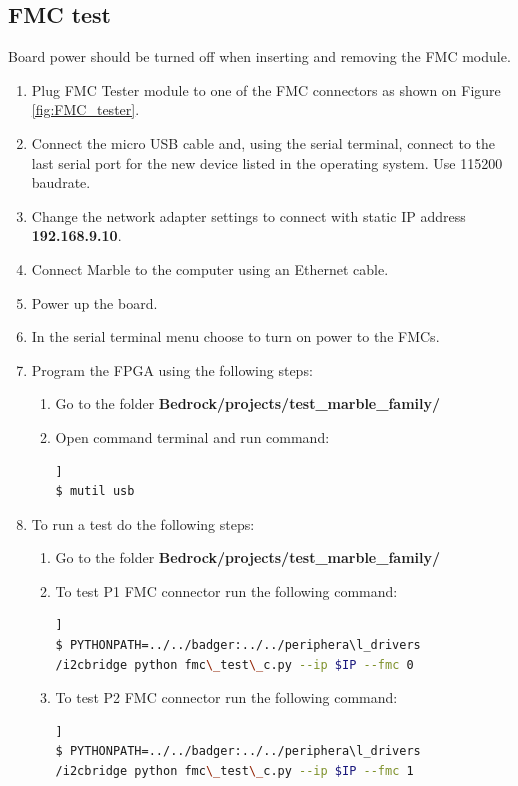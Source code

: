 \documentclass[12pt,oneside,a4]{article}
\begin{document}
\subsection{FMC test}
\begin{leftbar}
Board power should be turned off when inserting and removing the FMC module.
\end{leftbar}
\begin{enumerate}
	\item Plug FMC Tester module to one of the FMC connectors as shown on Figure \ref{fig:FMC_tester}.
	\item Connect the micro USB cable and, using the serial terminal, connect to the last serial port for the new device listed in the operating system. Use 115200 baudrate.
	\item Change the network adapter settings to connect with static IP address \textbf{192.168.9.10}.
	\item Connect Marble to the computer using an Ethernet cable.
	\item Power up the board.
	\item In the serial terminal menu choose  to turn on power to the FMCs.
	\item Program the FPGA using the following steps:
	\begin{enumerate}
	\item Go to the folder \textbf{Bedrock/projects/test\_marble\_family/}
	\item Open command terminal and run command:
	\begin{lstlisting}[backgroundcolor = \color{Gainsboro}, language=bash, frame=none]]
$ mutil usb
	\end{lstlisting}
	\end{enumerate}
	\item To run a test do the following steps:
	\begin{enumerate}
	\item Go to the folder \textbf{Bedrock/projects/test\_marble\_family/}
	\item To test P1 FMC connector run the following command:
	\begin{lstlisting}[backgroundcolor = \color{Gainsboro}, language=bash, frame=none]]
$ PYTHONPATH=../../badger:../../periphera\l_drivers
/i2cbridge python fmc\_test\_c.py --ip $IP --fmc 0
	\end{lstlisting}
	\item To test P2 FMC connector run the following command:
	\begin{lstlisting}[backgroundcolor = \color{Gainsboro}, language=bash, frame=none]]
$ PYTHONPATH=../../badger:../../periphera\l_drivers
/i2cbridge python fmc\_test\_c.py --ip $IP --fmc 1
	\end{lstlisting}
	\end{enumerate}
\end{enumerate}
\end{document}
